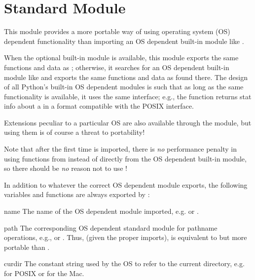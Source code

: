 \section{Standard Module }

This module provides a more portable way of using operating system
(OS) dependent functionality than importing an OS dependent built-in
module like .

When the optional built-in module  is available, this
module exports the same functions and data as ; otherwise,
it searches for an OS dependent built-in module like  and
exports the same functions and data as found there.  The design of all
Python's built-in OS dependent modules is such that as long as the same
functionality is available, it uses the same interface; e.g., the
function  returns stat info about a  in a
format compatible with the POSIX interface.

Extensions peculiar to a particular OS are also available through the
 module, but using them is of course a threat to portability!

Note that after the first time  is imported, there is \emph{no}
performance penalty in using functions from  instead of
directly from the OS dependent built-in module, so there should be
\emph{no} reason not to use !

In addition to whatever the correct OS dependent module exports, the
following variables and functions are always exported by :

\renewcommand{\indexsubitem}{(in module os)}
\begin{datadesc}{name}
The name of the OS dependent module imported, e.g.  or
.
\end{datadesc}

\begin{datadesc}{path}
The corresponding OS dependent standard module for pathname
operations, e.g.,  or .  Thus, (given
the proper imports),  is equivalent to but
more portable than .
\end{datadesc}

\begin{datadesc}{curdir}
The constant string used by the OS to refer to the current directory,
e.g.  for POSIX or  for the Mac.
\end{datadesc}

